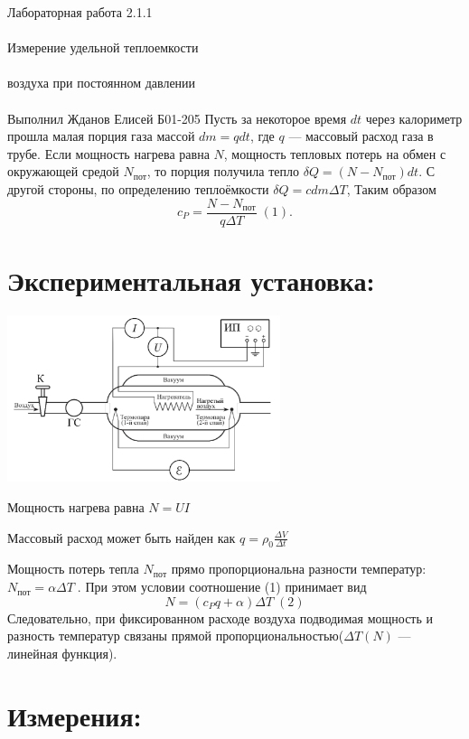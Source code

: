 \documentclass{astroedu-lab}
\begin{document}
\begin{problem}{\huge Лабораторная работа 2.1.1\\\\Измерение удельной теплоемкости\\\\воздуха при постоянном давлении\\\\Выполнил Жданов Елисей Б01-205}
		 Пусть за некоторое
		 время $dt$ через калориметр прошла
		 малая порция газа массой $dm=q dt$,
		 где $q$ — массовый расход газа в трубе. Если мощность нагрева равна $N$, мощность тепловых потерь на обмен с окружающей средой $N_{\text{пот}}$, то порция получила тепло $\delta Q = (N-N_{\text{пот}})dt$. С другой стороны, по определению теплоёмкости $\delta Q = c dm \Delta T$,  Таким образом $$c_{P} = \frac{N-N_{пот}}{q\Delta T} \; (1).$$
		 
	\section{Экспериментальная установка:}
	
	\begin{center}
\includegraphics[width=0.6\textwidth]{lab_2_1_1_ust.png}
\label{ris:image}
\end{center}
	
		Мощность нагрева равна
		$N= UI \; $
		
		
		Массовый расход может быть найден как $q = \rho_{0} \frac{\Delta V}{\Delta t} \;$
		
		Мощность потерь тепла $N_{пот}$ прямо пропорциональна разности температур: $ N_{пот} = \alpha \Delta T \; $. При этом условии соотношение (1) принимает вид $$N = (c_{P}q +\alpha)\Delta T \;(2)$$
		Следовательно, при фиксированном расходе воздуха  подводимая мощность и разность температур связаны прямой пропорциональностью($\Delta T(N)$ — линейная функция).

\section{Измерения:}



\end{problem}
\end{document}
